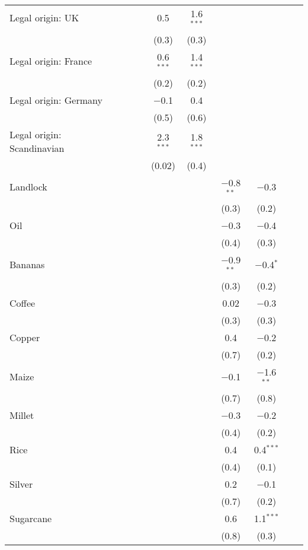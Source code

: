 {\begin{table}[]
\begin{threeparttable}
\begin{tabular}{@{\extracolsep{0pt}}lcccccccccc}
  Legal origin: UK &  &  &  &  & 0.5 & 1.6$^{***}$ &  &  &  &  \\ 
  &  &  &  &  & (0.3) & (0.3) &  &  &  &  \\ 
  Legal origin: France &  &  &  &  & 0.6$^{***}$ & 1.4$^{***}$ &  &  &  &  \\ 
  &  &  &  &  & (0.2) & (0.2) &  &  &  &  \\ 
  Legal origin: Germany &  &  &  &  & $-$0.1 & 0.4 &  &  &  &  \\ 
  &  &  &  &  & (0.5) & (0.6) &  &  &  &  \\ 
  Legal origin: Scandinavian &  &  &  &  & 2.3$^{***}$ & 1.8$^{***}$ &  &  &  &  \\ 
  &  &  &  &  & (0.02) & (0.4) &  &  &  &  \\ 
  Landlock &  &  &  &  &  &  & $-$0.8$^{**}$ & $-$0.3 &  &  \\ 
  &  &  &  &  &  &  & (0.3) & (0.2) &  &  \\ 
  Oil &  &  &  &  &  &  & $-$0.3 & $-$0.4 &  &  \\ 
  &  &  &  &  &  &  & (0.4) & (0.3) &  &  \\ 
  Bananas &  &  &  &  &  &  & $-$0.9$^{**}$ & $-$0.4$^{*}$ &  &  \\ 
  &  &  &  &  &  &  & (0.3) & (0.2) &  &  \\ 
  Coffee &  &  &  &  &  &  & 0.02 & $-$0.3 &  &  \\ 
  &  &  &  &  &  &  & (0.3) & (0.3) &  &  \\ 
  Copper &  &  &  &  &  &  & 0.4 & $-$0.2 &  &  \\ 
  &  &  &  &  &  &  & (0.7) & (0.2) &  &  \\ 
  Maize &  &  &  &  &  &  & $-$0.1 & $-$1.6$^{**}$ &  &  \\ 
  &  &  &  &  &  &  & (0.7) & (0.8) &  &  \\ 
  Millet &  &  &  &  &  &  & $-$0.3 & $-$0.2 &  &  \\ 
  &  &  &  &  &  &  & (0.4) & (0.2) &  &  \\ 
  Rice &  &  &  &  &  &  & 0.4 & 0.4$^{***}$ &  &  \\ 
  &  &  &  &  &  &  & (0.4) & (0.1) &  &  \\ 
  Silver &  &  &  &  &  &  & 0.2 & $-$0.1 &  &  \\ 
  &  &  &  &  &  &  & (0.7) & (0.2) &  &  \\ 
  Sugarcane &  &  &  &  &  &  & 0.6 & 1.1$^{***}$ &  &  \\ 
  &  &  &  &  &  &  & (0.8) & (0.3) &  &  \\ 

\end{tabular}
\end{threeparttable}
\end{table}}
